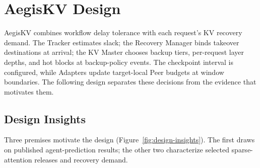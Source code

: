 \section{AegisKV Design}
\label{sec:design}

AegisKV combines workflow delay tolerance with each request's KV
recovery demand. The Tracker estimates slack; the Recovery Manager binds
takeover destinations at arrival; the KV Master chooses backup tiers,
per-request layer depths, and hot blocks at backup-policy events.
The checkpoint interval is configured, while Adapters update target-local
Peer budgets at window boundaries. The following design
separates these decisions from the evidence that motivates them.

\subsection{Design Insights}
\label{sec:design-insights}

Three premises motivate the design (Figure~\ref{fig:design-insights}).
The first draws on published agent-prediction results; the other two
characterize selected sparse-attention releases and recovery demand.

